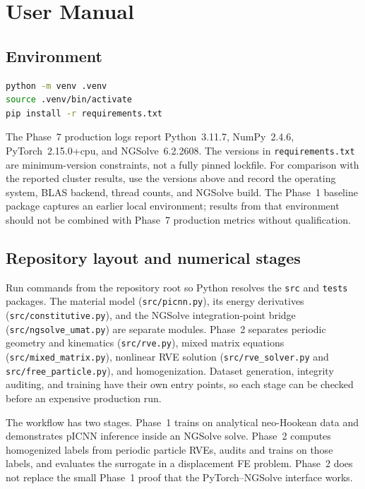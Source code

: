 \chapter{User Manual}
\label{ch:manual}

\section{Environment}

\begin{lstlisting}[language=bash]
python -m venv .venv
source .venv/bin/activate
pip install -r requirements.txt
\end{lstlisting}

The Phase~7 production logs report Python~3.11.7, NumPy~2.4.6,
PyTorch~2.15.0+cpu, and NGSolve~6.2.2608.
The versions in \texttt{requirements.txt} are minimum-version constraints,
not a fully pinned lockfile. For comparison with the reported cluster
results, use the versions above and record the operating system, BLAS
backend, thread counts, and NGSolve build. The Phase~1 baseline package
captures an earlier local environment; results from that environment should
not be combined with Phase~7 production metrics without qualification.

\section{Repository layout and numerical stages}

Run commands from the repository root so Python resolves the \texttt{src}
and \texttt{tests} packages. The material model
(\texttt{src/picnn.py}), its energy derivatives
(\texttt{src/constitutive.py}), and the NGSolve integration-point bridge
(\texttt{src/ngsolve\_umat.py}) are separate modules. Phase~2 separates
periodic geometry and kinematics (\texttt{src/rve.py}), mixed matrix
equations (\texttt{src/mixed\_matrix.py}), nonlinear RVE solution
(\texttt{src/rve\_solver.py} and \texttt{src/free\_particle.py}), and
homogenization. Dataset generation, integrity auditing, and training have
their own entry points, so each stage can be checked before an expensive
production run.

The workflow has two stages. Phase~1 trains on analytical neo-Hookean data
and demonstrates pICNN inference inside an NGSolve solve. Phase~2 computes
homogenized labels from periodic particle RVEs, audits and trains on those
labels, and evaluates the surrogate in a displacement FE problem. Phase~2
does not replace the small Phase~1 proof that the PyTorch--NGSolve interface
works.

